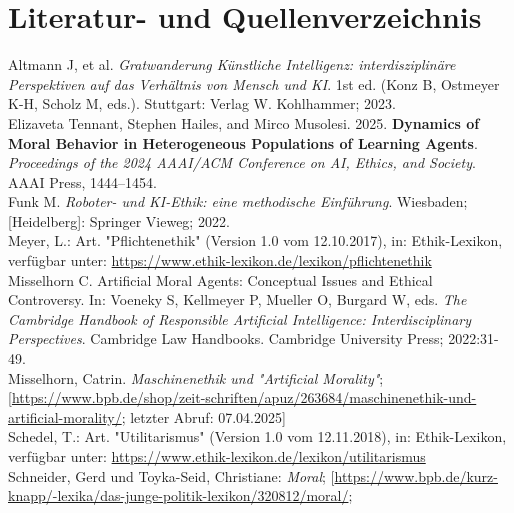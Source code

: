 \section{Literatur- und Quellenverzeichnis}\label{sec::literaturverzeichnis}

Altmann J, et al.
\textit{Gratwanderung Künstliche Intelligenz: interdisziplinäre Perspektiven auf das Verhältnis von Mensch und KI}.
1st ed.
(Konz B, Ostmeyer K-H, Scholz M, eds.). Stuttgart: Verlag W. Kohlhammer; 2023. \\
\newline
Elizaveta Tennant, Stephen Hailes, and Mirco Musolesi. 2025.
\textbf{Dynamics of Moral Behavior in Heterogeneous Populations of Learning Agents}.
\textit{Proceedings of the 2024 AAAI/ACM Conference on AI, Ethics, and Society}.
AAAI Press, 1444–1454. \\
\newline
Funk M.
\textit{Roboter- und KI-Ethik: eine methodische Einführung}.
Wiesbaden; [Heidelberg]: Springer Vieweg; 2022. \\
\newline
Meyer, L.: Art.
"Pflichtenethik" (Version 1.0 vom 12.10.2017), in: Ethik-Lexikon, verfügbar unter:
\href{https://www.ethik-lexikon.de/lexikon/pflichtenethik}{https://www.ethik-lexikon.de/lexikon/pflichtenethik} \\
\newline
Misselhorn C. Artificial Moral Agents:
Conceptual Issues and Ethical Controversy.
In: Voeneky S, Kellmeyer P, Mueller O, Burgard W, eds.
\textit{The Cambridge Handbook of Responsible Artificial Intelligence: Interdisciplinary Perspectives}.
Cambridge Law Handbooks.
Cambridge University Press; 2022:31-49. \\
\newline
Misselhorn, Catrin.
\textit{Maschinenethik und "Artificial Morality"};
[\href{https://www.bpb.de/shop/zeitschriften/apuz/263684/maschinenethik-und-artificial-morality/}{https://www.bpb.de/shop/zeit-schriften/apuz/263684/maschinenethik-und-artificial-morality/};
letzter Abruf: 07.04.2025] \\
\newline
Schedel, T.: Art.
"Utilitarismus" (Version 1.0 vom 12.11.2018), in: Ethik-Lexikon, verfügbar
unter: \href{https://www.ethik-lexikon.de/lexikon/utilitarismus}{https://www.ethik-lexikon.de/lexikon/utilitarismus} \\
\newline
Schneider, Gerd und Toyka-Seid, Christiane:
\textit{Moral};
[\href{https://www.bpb.de/kurz-knapp/lexika/das-junge-politik-lexikon/320812/moral/}{https://www.bpb.de/kurz-knapp/-lexika/das-junge-politik-lexikon/320812/moral/};
